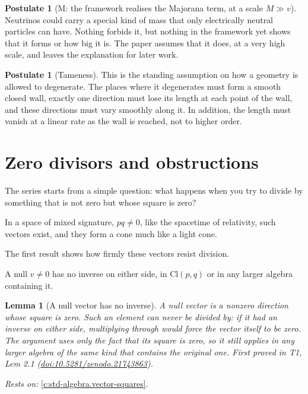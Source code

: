 \documentclass[11pt]{article}
\newtheorem{lemma}[theorem]{Lemma}
\theoremstyle{definition}
\newtheorem{postulate}[theorem]{Postulate}
\theoremstyle{plain}
\providecommand{\Cl}{}\renewcommand{\Cl}{\mathrm{Cl}}
\begin{document}
\begin{postulate}[M: the framework realises the Majorana term, at a scale $M \gg v$]\label{c:neutrino.m-framework-realises-majorana-term-scale}
Neutrinos could carry a special kind of mass that only electrically neutral particles can have. Nothing forbids it, but nothing in the framework yet shows that it forms or how big it is. The paper assumes that it does, at a very high scale, and leaves the explanation for later work.
\end{postulate}

\begin{postulate}[Tameness]\label{c:sheaf.tameness}
This is the standing assumption on how a geometry is allowed to degenerate. The places where it degenerates must form a smooth closed wall, exactly one direction must lose its length at each point of the wall, and these directions must vary smoothly along it. In addition, the length must vanish at a linear rate as the wall is reached, not to higher order.
\end{postulate}

\section{Zero divisors and obstructions}

The series starts from a simple question: what happens when you try to divide by something that is not zero but whose square is zero?

In a space of mixed signature, $pq \neq 0$, like the spacetime of relativity, such vectors exist, and they form a cone much like a light cone.

The first result shows how firmly these vectors resist division.

A null $v \neq 0$ has no inverse on either side, in $\Cl(p,q)$ or in any larger algebra containing it.

\begin{lemma}[A null vector has no inverse]\label{c:transport.noinverse}
A null vector is a nonzero direction whose square is zero. Such an element can never be divided by: if it had an inverse on either side, multiplying through would force the vector itself to be zero. The argument uses only the fact that its square is zero, so it still applies in any larger algebra of the same kind that contains the original one.
\emph{First proved in} T1, Lem 2.1 (\href{https://doi.org/10.5281/zenodo.21743863}{doi:10.5281/zenodo.21743863}).
\end{lemma}
\noindent\emph{Rests on:} \ref{c:std-algebra.vector-squares}.
\end{document}
